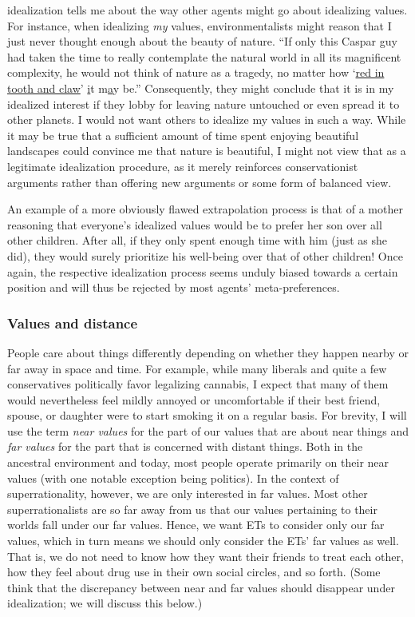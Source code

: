 idealization tells me about the way other agents might go about
idealizing values. For instance, when idealizing \emph{my} values,
environmentalists might reason that I just never thought enough about
the beauty of nature. ``If only this Caspar guy had taken the time to
really contemplate the natural world in all its magnificent complexity,
he would not think of nature as a tragedy, no matter how
`\href{https://en.wikipedia.org/wiki/In_Memoriam_A.H.H.}{red in
tooth and claw}'
\href{https://en.wikipedia.org/wiki/In_Memoriam_A.H.H.}{i}t
m\href{https://en.wikipedia.org/wiki/In_Memoriam_A.H.H.}{a}y be.''
Consequently, they might conclude that it is in my idealized interest if
they lobby for leaving nature untouched or even spread it to other
planets. I would not want others to idealize my values in such a way.
While it may be true that a sufficient amount of time spent enjoying
beautiful landscapes could convince me that nature is beautiful, I might
not view that as a legitimate idealization procedure, as it merely
reinforces conservationist arguments rather than offering new arguments
or some form of balanced view.

An example of a more obviously flawed extrapolation process is that of a
mother reasoning that everyone's idealized values would be to prefer her
son over all other children. After all, if they only spent enough time
with him (just as she did), they would surely prioritize his well-being
over that of other children! Once again, the respective idealization
process seems unduly biased towards a certain position and will thus be
rejected by most agents' meta-preferences.

\hypertarget{values-and-distance}{\subsubsection{Values and
distance}\label{values-and-distance}}

People care about things differently depending on whether they happen
nearby or far away in space and time. For example, while many liberals
and quite a few conservatives politically favor legalizing cannabis, I
expect that many of them would nevertheless feel mildly annoyed or
uncomfortable if their best friend, spouse, or daughter were to start
smoking it on a regular basis. For brevity, I will use the term
\emph{near values} for the part of our values that are about near things
and \emph{far values} for the part that is concerned with distant
things. Both in the ancestral environment and today, most people operate
primarily on their near values (with one notable exception being
politics). In the context of superrationality, however, we are only
interested in far values. Most other superrationalists are so far away
from us that our values pertaining to their worlds fall under our far
values. Hence, we want ETs to consider only our far values, which in
turn means we should only consider the ETs' far values as well. That is,
we do not need to know how they want their friends to treat each other,
how they feel about drug use in their own social circles, and so forth.
(Some think that the discrepancy between near and far values should
disappear under idealization; we will discuss this below.)

